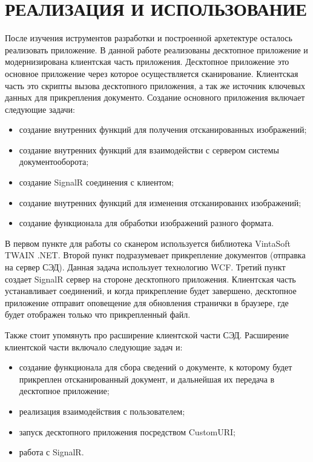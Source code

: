 \section{РЕАЛИЗАЦИЯ И ИСПОЛЬЗОВАНИЕ}
\label{sec:manual}

После изучения иструментов разработки и построенной архетектуре осталось реализовать приложение.
В данной работе реализованы десктопное приложение и модернизирована клиентская часть приложения. Десктопное приложение это основное приложение через которое осуществляется сканирование. Клиентская часть это скрипты вызова десктопного приложения, а так же источник ключевых данных для прикрепления документо. Создание основного приложения включает следующие
задачи:
\begin{itemize}
  \item создание внутренних функций для получения отсканированных изображений;
  \item создание внутренних функций для взаимодействи с сервером системы документооборота;
  \item создание SignalR соединения с клиентом;
  \item создание внутренних функций для изменения отсканированнх изображений;
  \item создание функционала для обработки изображений разного формата.
\end{itemize}

В первом пункте для работы со сканером используется библиотека VintaSoft TWAIN .NET. Второй пункт подразумевает прикрепление документов (отправка на сервер СЭД). Данная задача использует технологию WCF. Третий пункт создает SignalR сервер на стороне десктопного приложения. Клиентская часть устанавливает соединений, и когда прикрепление будет завершено, десктопное приложение отправит оповещение для обновления странички в браузере, где будет отображен только что прикрепленный файл.

Также стоит упомянуть про расширение клиентской части СЭД. Расширение клиентской части включало следующие задач   и:
\begin{itemize}
	\item создание функционала для сбора сведений о документе, к которому будет прикреплен отсканированный документ, и дальнейшая их передача в десктопное приложение;
	\item реализация взаимодействия с пользователем;
	\item запуск десктопного приложения посредством CustomURI;
	\item работа с SignalR.
\end{itemize}


